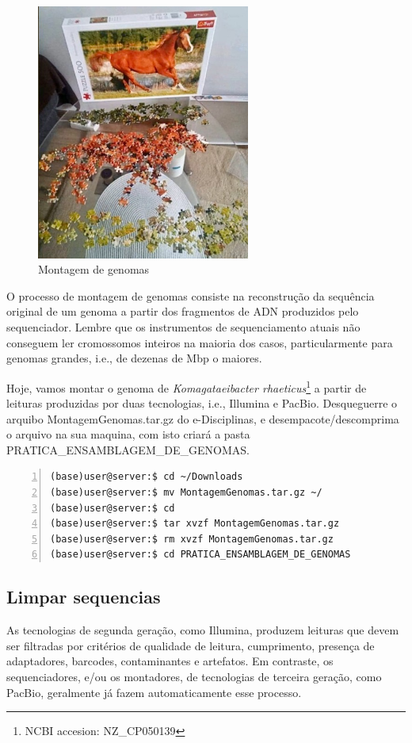 \documentclass[letter,11pt]{book}
\begin{document}
\begin{figure}[h!]
\centering
 \includegraphics[width=7cm]{Figs/montagem_de_genoma.jpeg}
 \caption{\label{fig:fastqc}Montagem de genomas}
\end{figure}


O processo de montagem de genomas consiste na reconstrução da sequência original de um genoma a partir dos fragmentos de ADN produzidos pelo sequenciador. Lembre que os instrumentos de sequenciamento atuais não conseguem ler cromossomos inteiros na maioria dos casos, particularmente para genomas grandes, i.e., de dezenas de Mbp o maiores.

Hoje, vamos montar o genoma de \emph{Komagataeibacter rhaeticus}\footnote{NCBI accesion: NZ\_CP050139} a partir de leituras produzidas por duas tecnologias, i.e., Illumina e PacBio. Desqueguerre o arquibo MontagemGenomas.tar.gz do e-Disciplinas, e desempacote/descomprima o arquivo na sua maquina, com isto criará a pasta PRATICA\_ENSAMBLAGEM\_DE\_GENOMAS.

\begin{Verbatim}[commandchars=!\{\}, numbers=left,label= indo na pasta de trabalho, frame=topline,fontsize=\scriptsize]
(base)user@server:$ cd ~/Downloads
(base)user@server:$ mv MontagemGenomas.tar.gz ~/
(base)user@server:$ cd 
(base)user@server:$ tar xvzf MontagemGenomas.tar.gz
(base)user@server:$ rm xvzf MontagemGenomas.tar.gz
(base)user@server:$ cd PRATICA_ENSAMBLAGEM_DE_GENOMAS
\end{Verbatim}


\subsection{Limpar sequencias}
As tecnologias de segunda geração, como Illumina, produzem leituras que devem ser filtradas por critérios de qualidade de leitura, cumprimento, presença de adaptadores, barcodes, contaminantes e artefatos.
Em contraste, os sequenciadores, e/ou os montadores, de tecnologias de terceira geração, como PacBio, geralmente já fazem automaticamente esse processo.
\end{document}

